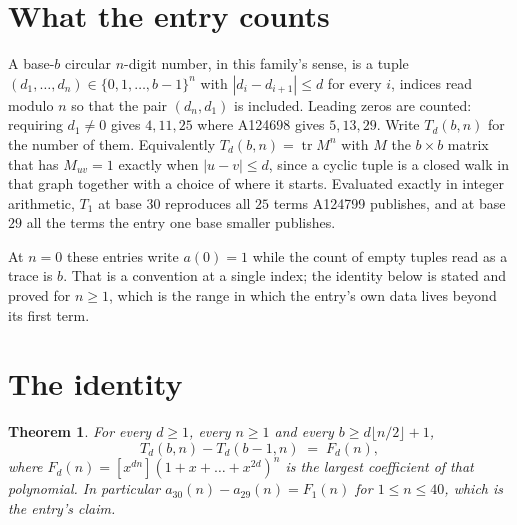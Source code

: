 \documentclass[11pt,a4paper]{article}
\theoremstyle{plain}
\newtheorem{theorem}{Theorem}
\theoremstyle{definition}
\begin{document}
\section{What the entry counts}

A base-$b$ circular $n$-digit number, in this family's sense, is a tuple
$(d_1,\dots,d_n)\in\{0,1,\dots,b-1\}^{n}$ with $|d_i-d_{i+1}|\le d$ for every $i$, indices
read modulo $n$ so that the pair $(d_n,d_1)$ is included. Leading zeros are counted: requiring
$d_1\ne0$ gives $4,11,25$ where A124698 gives $5,13,29$. Write $T_d(b,n)$ for the number of
them. Equivalently $T_d(b,n)=\operatorname{tr}M^{n}$ with $M$ the $b\times b$ matrix that has
$M_{uv}=1$ exactly when $|u-v|\le d$, since a cyclic tuple is a closed walk in that graph
together with a choice of where it starts. Evaluated exactly in integer arithmetic, $T_{1}$
at base $30$ reproduces all $25$ terms A124799 publishes, and at base $29$ all the
terms the entry one base smaller publishes.

At $n=0$ these entries write $a(0)=1$ while the count of empty tuples read as a trace is $b$.
That is a convention at a single index; the identity below is stated and proved for $n\ge1$,
which is the range in which the entry's own data lives beyond its first term.

\section{The identity}

\begin{theorem}
For every $d\ge1$, every $n\ge1$ and every $b\ge d\lfloor n/2\rfloor+1$,
\[
T_d(b,n)-T_d(b-1,n)\;=\;F_d(n),
\]
where $F_d(n)=[x^{dn}](1+x+\dots+x^{2d})^{n}$ is the largest coefficient of that
polynomial. In particular $a_{30}(n)-a_{29}(n)=F_{1}(n)$ for $1\le n\le40$, which
is the entry's claim.
\end{theorem}
\end{document}
